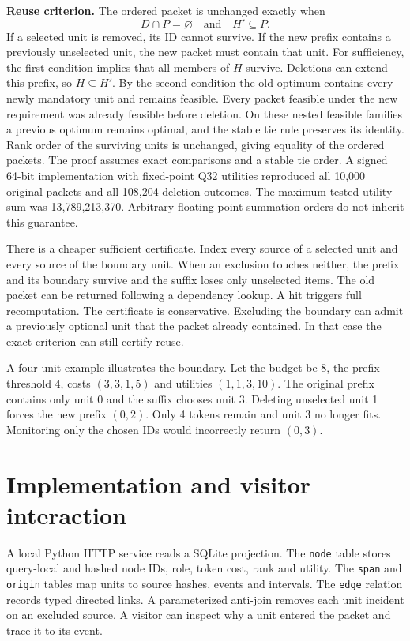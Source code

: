 \documentclass[conference]{IEEEtran}
\begin{document}
\textbf{Reuse criterion.} The ordered packet is unchanged exactly when
\[
           D\cap P=\varnothing \quad\text{and}\quad H'\subseteq P.
\]
If a selected unit is removed, its ID cannot survive. If the new prefix contains a previously unselected unit, the new packet must contain that unit. For sufficiency, the first condition implies that all members of $H$ survive. Deletions can extend this prefix, so $H\subseteq H'$. By the second condition the old optimum contains every newly mandatory unit and remains feasible. Every packet feasible under the new requirement was already feasible before deletion. On these nested feasible families a previous optimum remains optimal, and the stable tie rule preserves its identity. Rank order of the surviving units is unchanged, giving equality of the ordered packets. The proof assumes exact comparisons and a stable tie order. A signed 64-bit implementation with fixed-point Q32 utilities reproduced all 10,000 original packets and all 108,204 deletion outcomes. The maximum tested utility sum was 13,789,213,370. Arbitrary floating-point summation orders do not inherit this guarantee.

There is a cheaper sufficient certificate. Index every source of a selected unit and every source of the boundary unit. When an exclusion touches neither, the prefix and its boundary survive and the suffix loses only unselected items. The old packet can be returned following a dependency lookup. A hit triggers full recomputation. The certificate is conservative. Excluding the boundary can admit a previously optional unit that the packet already contained. In that case the exact criterion can still certify reuse.

A four-unit example illustrates the boundary. Let the budget be 8, the prefix threshold 4, costs $(3,3,1,5)$ and utilities $(1,1,3,10)$. The original prefix contains only unit 0 and the suffix chooses unit 3. Deleting unselected unit 1 forces the new prefix $(0,2)$. Only 4 tokens remain and unit 3 no longer fits. Monitoring only the chosen IDs would incorrectly return $(0,3)$.

\section{Implementation and visitor interaction}

A local Python HTTP service reads a SQLite projection. The \texttt{node} table stores query-local and hashed node IDs, role, token cost, rank and utility. The \texttt{span} and \texttt{origin} tables map units to source hashes, events and intervals. The \texttt{edge} relation records typed directed links. A parameterized anti-join removes each unit incident on an excluded source. A visitor can inspect why a unit entered the packet and trace it to its event.
\end{document}
